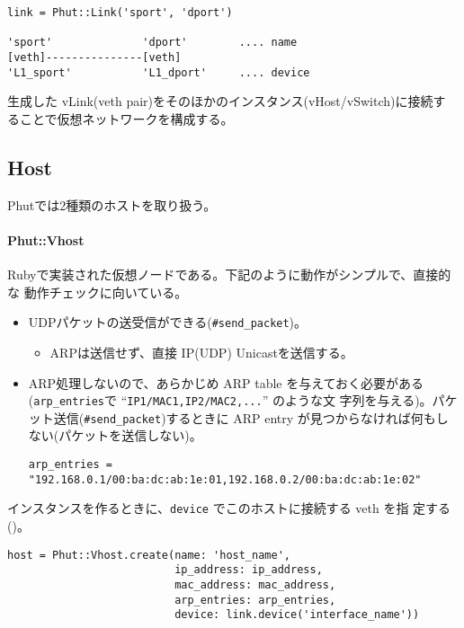 \begin{textbox}
\begin{verbatim}
link = Phut::Link('sport', 'dport')

'sport'              'dport'        .... name
[veth]---------------[veth]
'L1_sport'           'L1_dport'     .... device
\end{verbatim}
\end{textbox}

生成した vLink(veth pair)をそのほかのインスタンス(vHost/vSwitch)に接続す
ることで仮想ネットワークを構成する。

\subsection{Host}
Phutでは2種類のホストを取り扱う。

\paragraph{Phut::Vhost}

Rubyで実装された仮想ノードである。下記のように動作がシンプルで、直接的な
動作チェックに向いている。
\begin{itemize}
 \item UDPパケットの送受信ができる(\verb|#send_packet|)。
       \begin{itemize}
        \item ARPは送信せず、直接 IP(UDP) Unicastを送信する。
       \end{itemize}
 \item ARP処理しないので、あらかじめ ARP table を与えておく必要がある
       (\verb|arp_entries|で ``\verb|IP1/MAC1,IP2/MAC2,...|'' のような文
       字列を与える)。パケット送信(\verb|#send_packet|)するときに ARP
       entry が見つからなければ何もしない(パケットを送信しない)。
\begin{lstlisting}[title=\code{arp\_entries}の例]
arp_entries = "192.168.0.1/00:ba:dc:ab:1e:01,192.168.0.2/00:ba:dc:ab:1e:02"
\end{lstlisting}
\end{itemize}


インスタンスを作るときに、\verb|device| でこのホストに接続する veth を指
定する()。
\begin{lstlisting}[caption=Phut::Vhostインスタンスの作成,label=lst:create-vhost-instance]
host = Phut::Vhost.create(name: 'host_name',
                          ip_address: ip_address,
                          mac_address: mac_address,
                          arp_entries: arp_entries,
                          device: link.device('interface_name'))
\end{lstlisting}

